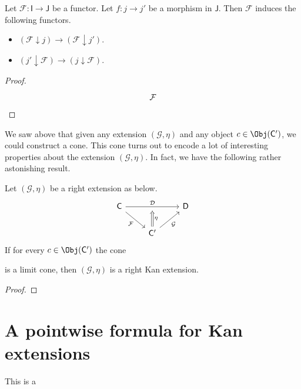 \documentclass[notes.tex]{subfiles}
\begin{document}
\begin{lemma}
  \label{lemma:morphism_induces_functor_between_comma_categories}
  Let $\mathcal{F}\colon \mathsf{I} \to \mathsf{J}$ be a functor. Let $f\colon j \to j'$ be a morphism in $\mathsf{J}$. Then $\mathcal{F}$ induces the following functors.
  \begin{itemize}
    \item $(\mathcal{F} \downarrow j) \to (\mathcal{F} \downarrow j')$.

    \item $(j' \downarrow \mathcal{F}) \to (j \downarrow \mathcal{F})$.
  \end{itemize}
\end{lemma}
\begin{proof}
  \begin{equation*}
    \begin{tikzcd}
      \mathcal{F}
    \end{tikzcd}
  \end{equation*}
\end{proof}

We saw above that given any extension $(\mathcal{G}, \eta)$ and any object $c \in \Obj(\mathsf{C}')$, we could construct a cone. This cone turns out to encode a lot of interesting properties about the extension $(\mathcal{G}, \eta)$. In fact, we have the following rather astonishing result.

\begin{theorem}
  Let $(\mathcal{G}, \eta)$ be a right extension as below.
  \begin{equation*}
    \begin{tikzcd}
      \mathsf{C}
      \arrow[dr, swap, "\mathcal{F}"]
      \arrow[rr, "\mathcal{D}", ""'{name=U}]
      && \mathsf{D}
      \\
      & \mathsf{C'}
      \arrow[ur, swap, "\mathcal{G}"]
      \arrow[d, to=U, Rightarrow, swap, "\eta"] 
    \end{tikzcd}
  \end{equation*}
  If for every $c \in \Obj(\mathsf{C'})$ the cone 

  is a limit cone, then $(\mathcal{G}, \eta)$ is a right Kan extension.
\end{theorem}
\begin{proof}

\end{proof}

\section{A pointwise formula for Kan extensions}
\label{sec:a_pointwise_formula_for_kan_extensions}

This is a 
\end{document}
